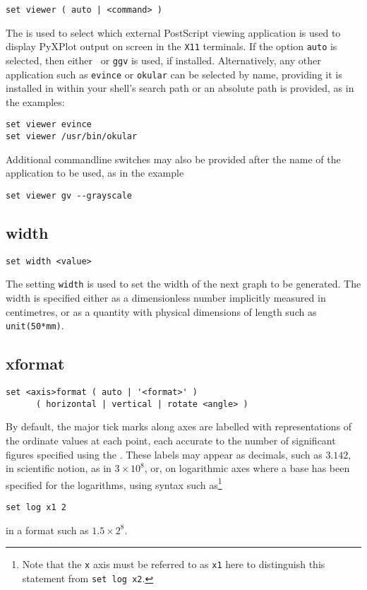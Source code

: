 \begin{verbatim}
set viewer ( auto | <command> )
\end{verbatim}

The  is used to select which external PostScript viewing
application is used to display PyXPlot output on screen in the {\tt X11}
terminals. If the option {\tt auto} is selected, then either \ghostview\ or
{\tt ggv} is used, if installed. Alternatively, any other application such as
{\tt evince} or {\tt okular} can be selected by name, providing it is installed
in within your shell's search path or an absolute path is provided, as in the
examples:

\begin{verbatim}
set viewer evince
set viewer /usr/bin/okular
\end{verbatim}

\noindent Additional commandline switches may also be provided after the name
of the application to be used, as in the example

\begin{verbatim}
set viewer gv --grayscale
\end{verbatim}


\subsection{width}

\begin{verbatim}
set width <value>
\end{verbatim}

The setting {\tt width} is used to set the width of the next graph to be
generated. The width is specified either as a dimensionless number
implicitly measured in centimetres, or as a quantity with physical dimensions
of length such as {\tt unit(50*mm)}.


\subsection{xformat}

\begin{verbatim}
set <axis>format ( auto | '<format>' )
      ( horizontal | vertical | rotate <angle> )
\end{verbatim}

By default, the major tick marks along axes are labelled with representations
of the ordinate values at each point, each accurate to the number of
significant figures specified using the . These
labels may appear as decimals, such as $3.142$, in scientific notion, as in
$3\times10^8$, or, on logarithmic axes where a base has been specified for the
logarithms, using syntax such as\footnote{Note that the {\tt x} axis must be
referred to as {\tt x1} here to distinguish this statement from {\tt set log
x2}.}
\begin{verbatim}
set log x1 2
\end{verbatim}
in a format such as $1.5\times2^8$.

